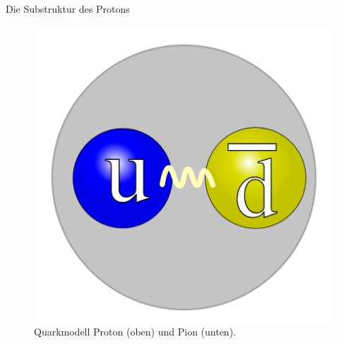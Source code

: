 \documentclass[t,9pt]{beamer}
\newcommand{\highlight}[3]{ \begin{textblock*}{#1}(#2,#3) \begin{tcolorbox} [enhanced,opacityfill=.1,colback=blue] \end{tcolorbox} \end{textblock*} } %
\begin{document}
\begin{frame}{Die Substruktur des Protons}
\begin{minipage}{.25\textwidth}
\begin{figure}
                                \includegraphics[width=.8\textwidth]{prosi_quark_pion.png}
                                \caption{Quarkmodell Proton (oben) und Pion (unten).\cite{WikiProton}\cite{WikiPion}}
                        \end{figure}
                \end{minipage}
        \end{frame}

\end{document}
